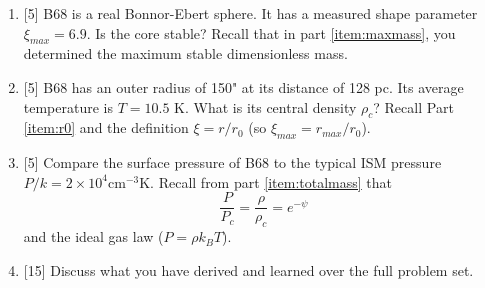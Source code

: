 \documentclass{article}
\begin{document}
\begin{enumerate}
%     
% 
% 
%     
% 


 \item {[5]} B68 is a real Bonnor-Ebert sphere.  It has a measured shape parameter $\xi_{max}=6.9$.
     Is the core stable?  Recall that in part \ref{item:maxmass}, you determined the maximum stable dimensionless
     mass.

 \item {[5]} B68 has an outer radius of 150" at its distance of 128 pc.  Its average temperature
     is $T=10.5$ K.  What is its central density $\rho_c$?  Recall Part \ref{item:r0} and the definition $\xi=r/r_0$ (so $\xi_{max} = r_{max}/r_0$).

 \item {[5]} Compare the surface pressure of B68 to the typical ISM pressure $P/k = 2\times10^4 \mathrm{cm}^{-3} \mathrm{K}$.
     Recall from part \ref{item:totalmass} that $$\frac{P}{P_c} = \frac{\rho}{\rho_c} = e^{-\psi}$$
    and the ideal gas law ($P = \rho k_B T$).

 \item {[15]} Discuss what you have derived and learned over the full problem set.  
\end{enumerate}
\end{document}
